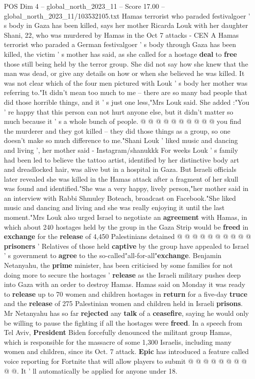 \begin{textsample}{POS Dim 4 – global\_north\_2023\_11 – Score 17.00 – global\_north\_2023\_11/103532105.txt}  \label{ex:f4_pos_207}
Hamas terrorist who paraded festivalgoer ' s body in Gaza has been killed, says her mother Ricarda Louk with her daughter Shani, 22, who was murdered by Hamas in the Oct 7 attacks - CEN A Hamas terrorist who paraded a German festivalgoer ' s body through Gaza has been killed, the victim ' s mother has said, as she called for a hostage \textbf{deal} to \textbf{free} those still being held by the terror group.
She did not say how she knew that the man was dead, or give any details on how or when she believed he was killed.
It was not clear which of the four men pictured with Louk ' s body her mother was referring to."It didn't mean too much to me -- there are so many bad people that did those horrible things, and it ' s just one less,"Mrs Louk said.
She added :"You ' re happy that this person can not hurt anyone else, but it didn't matter so much because it ' s a whole bunch of people. @ @ @ @ @ @ @ @ @ @ you find the murderer and they got killed -- they did those things as a group, so one doesn't make so much difference to me."Shani Louk ' liked music and dancing and living ', her mother said - Instagram/shanukkk For weeks Louk ' s family had been led to believe the tattoo artist, identified by her distinctive body art and dreadlocked hair, was alive but in a hospital in Gaza.
But Israeli officials later revealed she was killed in the Hamas attack after a fragment of her skull was found and identified."She was a very happy, lively person,"her mother said in an interview with Rabbi Shmuley Boteach, broadcast on Facebook."She liked music and dancing and living and she was really enjoying it until the last moment."Mrs Louk also urged Israel to negotiate an \textbf{agreement} with Hamas, in which about 240 hostages held by the group in the Gaza Strip would be \textbf{freed} in \textbf{exchange} for the \textbf{release} of 4,450 Palestinians detained @ @ @ @ @ @ @ @ @ @ \textbf{prisoners} ' Relatives of those held \textbf{captive} by the group have appealed to Israel ' s government to \textbf{agree} to the so-called"all-for-all"\textbf{exchange}.
Benjamin Netanyahu, the \textbf{prime} minister, has been criticised by some families for not doing more to secure the hostages ' \textbf{release} as the Israeli military pushes deep into Gaza with an order to destroy Hamas.
Hamas said on Monday it was ready to \textbf{release} up to 70 women and children hostages in \textbf{return} for a five-day \textbf{truce} and the \textbf{release} of 275 Palestinian women and children held in Israeli \textbf{prisons}.
Mr Netanyahu has so far \textbf{rejected} any \textbf{talk} of a \textbf{ceasefire}, saying he would only be willing to pause the fighting if all the hostages were \textbf{freed}.
In a speech from Tel Aviv, \textbf{President} Biden forcefully denounced the militant group Hamas, which is responsible for the massacre of some 1,300 Israelis, including many women and children, since its Oct. 7 attack. \textbf{Epic} has introduced a feature called voice reporting for Fortnite that will allow players to submit @ @ @ @ @ @ @ @ @ @.
It ' ll automatically be applied for anyone under 18.


\end{textsample}

